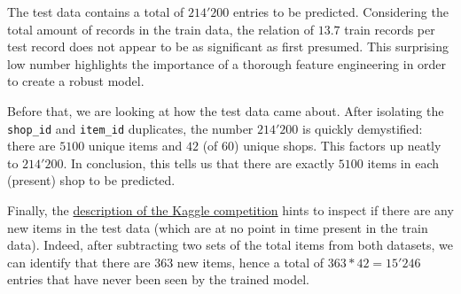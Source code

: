 The test data contains a total of $214'200$ entries to be predicted. Considering the total amount of records in the train data, the relation of $13.7$ train records per test record does not appear to be as significant as first presumed. This surprising low number highlights the importance of a thorough feature engineering in order to create a robust model.

Before that, we are looking at how the test data came about. After isolating the \texttt{shop\_id} and \texttt{item\_id} duplicates, the number $214'200$ is quickly demystified: there are $5100$ unique items and $42$ (of $60$) unique shops. 
This factors up neatly to $214'200$.
In conclusion, this tells us that there are exactly $5100$ items in each (present) shop to be predicted.

Finally, the \href{https://www.kaggle.com/c/competitive-data-science-predict-future-sales/data}{description of the Kaggle competition} hints to inspect if there are any new items in the test data (which are at no point in time present in the train data). 
Indeed, after subtracting two sets of the total items from both datasets, we can identify that there are $363$ new items, hence a total of $363*42=15'246$ entries that have never been seen by the trained model.
